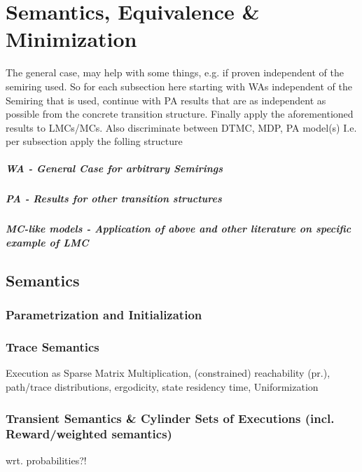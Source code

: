 \chapter{Semantics, Equivalence \& Minimization}\label{\positionnumber}  
        The general case, may help with some things, e.g. if proven independent of the semiring used. So for each subsection here starting with WAs independent of the Semiring that is used, continue with PA results that are as independent as possible from the concrete transition structure. Finally apply the aforementioned results to LMCs/MCs. Also discriminate between DTMC, MDP, PA model(s) I.e. per subsection apply the folling structure
        
            \paragraph{WA - General Case for arbitrary Semirings}
            
            \paragraph{PA - Results for other transition structures}
            
            \paragraph{MC-like models - Application of above and other literature on specific example of LMC}


    \section{Semantics}
        \subsection{Parametrization and Initialization}
    
        \subsection{Trace Semantics}
            Execution as Sparse Matrix Multiplication, 
            (constrained) reachability (pr.), path/trace distributions,
            ergodicity, state residency time, Uniformization
            
        
        
        \subsection{Transient Semantics \& Cylinder Sets of Executions (incl. Reward/weighted semantics)}
        wrt. probabilities?!
            
